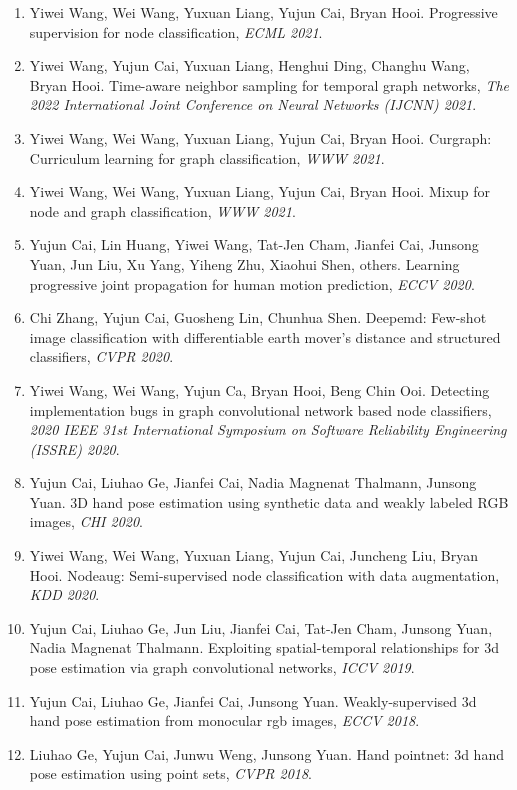 \begin{enumerate}
\item Yiwei Wang, Wei Wang, Yuxuan Liang, Yujun Cai, Bryan Hooi. Progressive supervision for node classification, \textit{ECML 2021}.

\item Yiwei Wang, Yujun Cai, Yuxuan Liang, Henghui Ding, Changhu Wang, Bryan Hooi. Time-aware neighbor sampling for temporal graph networks, \textit{The 2022 International Joint Conference on Neural Networks (IJCNN) 2021}.

\item Yiwei Wang, Wei Wang, Yuxuan Liang, Yujun Cai, Bryan Hooi. Curgraph: Curriculum learning for graph classification, \textit{WWW 2021}.

\item Yiwei Wang, Wei Wang, Yuxuan Liang, Yujun Cai, Bryan Hooi. Mixup for node and graph classification, \textit{WWW 2021}.

\item Yujun Cai, Lin Huang, Yiwei Wang, Tat-Jen Cham, Jianfei Cai, Junsong Yuan, Jun Liu, Xu Yang, Yiheng Zhu, Xiaohui Shen, others. Learning progressive joint propagation for human motion prediction, \textit{ECCV 2020}.

\item Chi Zhang, Yujun Cai, Guosheng Lin, Chunhua Shen. Deepemd: Few-shot image classification with differentiable earth mover's distance and structured classifiers, \textit{CVPR 2020}.

\item Yiwei Wang, Wei Wang, Yujun Ca, Bryan Hooi, Beng Chin Ooi. Detecting implementation bugs in graph convolutional network based node classifiers, \textit{2020 IEEE 31st International Symposium on Software Reliability Engineering (ISSRE) 2020}.

\item Yujun Cai, Liuhao Ge, Jianfei Cai, Nadia Magnenat Thalmann, Junsong Yuan. 3D hand pose estimation using synthetic data and weakly labeled RGB images, \textit{CHI 2020}.

\item Yiwei Wang, Wei Wang, Yuxuan Liang, Yujun Cai, Juncheng Liu, Bryan Hooi. Nodeaug: Semi-supervised node classification with data augmentation, \textit{KDD 2020}.

\item Yujun Cai, Liuhao Ge, Jun Liu, Jianfei Cai, Tat-Jen Cham, Junsong Yuan, Nadia Magnenat Thalmann. Exploiting spatial-temporal relationships for 3d pose estimation via graph convolutional networks, \textit{ICCV 2019}.

\item Yujun Cai, Liuhao Ge, Jianfei Cai, Junsong Yuan. Weakly-supervised 3d hand pose estimation from monocular rgb images, \textit{ECCV 2018}.

\item Liuhao Ge, Yujun Cai, Junwu Weng, Junsong Yuan. Hand pointnet: 3d hand pose estimation using point sets, \textit{CVPR 2018}.
\end{enumerate}